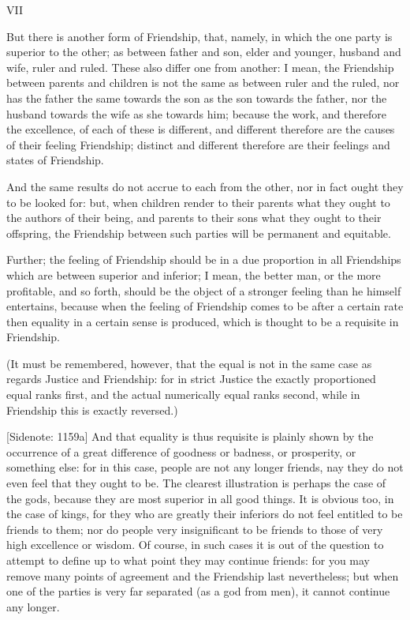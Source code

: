 VII

But there is another form of Friendship, that, namely, in which the one
party is superior to the other; as between father and son, elder and
younger, husband and wife, ruler and ruled. These also differ one from
another: I mean, the Friendship between parents and children is not the
same as between ruler and the ruled, nor has the father the same towards
the son as the son towards the father, nor the husband towards the wife
as she towards him; because the work, and therefore the excellence, of
each of these is different, and different therefore are the causes of
their feeling Friendship; distinct and different therefore are their
feelings and states of Friendship.

And the same results do not accrue to each from the other, nor in fact
ought they to be looked for: but, when children render to their parents
what they ought to the authors of their being, and parents to their sons
what they ought to their offspring, the Friendship between such parties
will be permanent and equitable.

Further; the feeling of Friendship should be in a due proportion in all
Friendships which are between superior and inferior; I mean, the better
man, or the more profitable, and so forth, should be the object of a
stronger feeling than he himself entertains, because when the feeling of
Friendship comes to be after a certain rate then equality in a certain
sense is produced, which is thought to be a requisite in Friendship.

(It must be remembered, however, that the equal is not in the same case
as regards Justice and Friendship: for in strict Justice the exactly
proportioned equal ranks first, and the actual numerically equal ranks
second, while in Friendship this is exactly reversed.)

[Sidenote: 1159a] And that equality is thus requisite is plainly shown
by the occurrence of a great difference of goodness or badness, or
prosperity, or something else: for in this case, people are not any
longer friends, nay they do not even feel that they ought to be. The
clearest illustration is perhaps the case of the gods, because they are
most superior in all good things. It is obvious too, in the case of
kings, for they who are greatly their inferiors do not feel entitled to
be friends to them; nor do people very insignificant to be friends to
those of very high excellence or wisdom. Of course, in such cases it
is out of the question to attempt to define up to what point they may
continue friends: for you may remove many points of agreement and the
Friendship last nevertheless; but when one of the parties is very far
separated (as a god from men), it cannot continue any longer.

